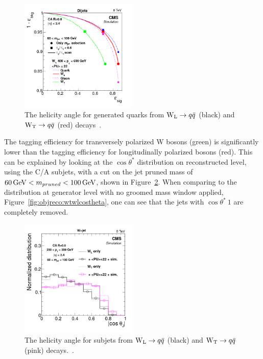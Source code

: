 \begin{figure}[h] 
    \centering 
    \includegraphics[width=0.5\textwidth]{figures/event_reconstruction/substructure_pas_roc3b.png}
     \caption{The helicity angle for generated quarks from $\mathrm{W}_{\mathrm{L}}\rightarrow q\bar{q}$ (black) and $\mathrm{W}_{\mathrm{T}}\rightarrow q\bar{q}$ (red) decays~\cite{Khachatryan:2014vla}.}
     \label{fig:objreco:wtwleff}
 \end{figure}

The tagging efficiency for transversely polarized W bosons (green) is significantly lower than the tagging efficiency for longitudinally polarized bosons (red). This can be explained by looking at the  $\cos \theta^*$ distribution on reconstructed level, using the C/A subjets, with a cut on the jet pruned mass of $60 \,\text{Ge\hspace{-.08em}V} < m_{pruned} < 100 \,\text{Ge\hspace{-.08em}V}$, shown in Figure~\ref{fig:objreco:wtwlcostheta_reco}. When comparing to the distribution at generator level with no groomed mass window applied, Figure~\ref{fig:objreco:wtwlcostheta}, one can see that the \PWT jets with $\cos \theta^*~1$ are completely removed.

\begin{figure}[h] 
    \centering 
    \includegraphics[width=0.5\textwidth]{figures/event_reconstruction/s1vs2-600_sjCosTheta_afterMass.png}
     \caption{The helicity angle for subjets from $\mathrm{W}_{\mathrm{L}}\rightarrow q\bar{q}$ (black) and $\mathrm{W}_{\mathrm{T}}\rightarrow q\bar{q}$ (pink) decays.~\cite{Khachatryan:2014vla}.}
     \label{fig:objreco:wtwlcostheta_reco}
 \end{figure}

